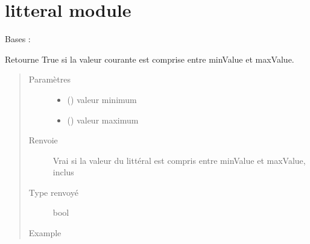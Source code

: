 \section{litteral module}
\label{\detokenize{litteral:module-litteral}}\label{\detokenize{litteral:litteral-module}}\label{\detokenize{litteral::doc}}\label{\detokenize{litteral:module-litteral}}

\begin{fulllineitems}
\label{\detokenize{litteral:litteral.Litteral}}
Bases : 

\begin{fulllineitems}
\label{\detokenize{litteral:litteral.Litteral.isBetween}}
Retourne True si la valeur courante est comprise entre minValue et maxValue.
\begin{quote}\begin{description}
\item[{Paramètres}] \leavevmode\begin{itemize}
\item {} 
 () \textendash{} valeur minimum

\item {} 
 () \textendash{} valeur maximum

\end{itemize}

\item[{Renvoie}] \leavevmode
Vrai si la valeur du littéral est compris entre minValue et maxValue, inclus

\item[{Type renvoyé}] \leavevmode
bool

\item[{Example}] \leavevmode
\begin{sphinxVerbatim}[commandchars=\\\{\}]
\end{sphinxVerbatim}


\end{description}
\end{quote}
\end{fulllineitems}
\end{fulllineitems}
